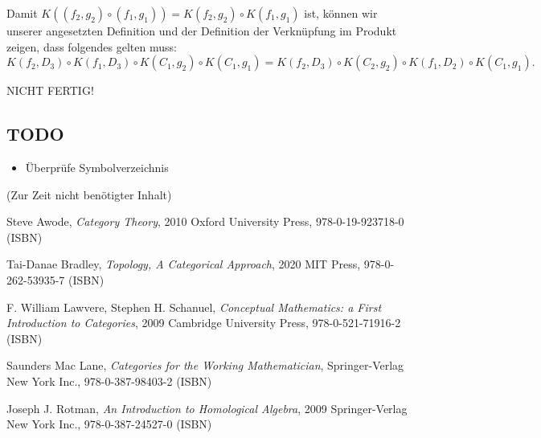 \documentclass[a4paper]{amsart}
\theoremstyle{definition}
\begin{document}
Damit $K((f_2,g_2) \circ (f_1,g_1)) = K(f_2,g_2) \circ K(f_1,g_1)$ ist, können wir unserer angesetzten Definition und der Definition der Verknüpfung im Produkt zeigen, dass folgendes gelten muss:
\begin{equation}
   K(f_2,D_3) \circ K(f_1, D_3)  \circ K(C_1, g_2)  \circ K(C_1,g_1) = K(f_2,D_3) \circ K(C_2,g_2)  \circ K(f_1,D_2)  \circ K(C_1,g_1).
\end{equation}


NICHT FERTIG!


\begin{backup}
\section{TODO}
\begin{itemize}
     \item Überprüfe Symbolverzeichnis
\end{itemize}

\end{backup}

\begin{backup}
    (Zur Zeit nicht benötigter Inhalt)
\end{backup}

\begin{thebibliography}{9}
      Steve Awode, \emph{Category Theory},
      2010 Oxford University Press, 978-0-19-923718-0 (ISBN)

      Tai-Danae Bradley, \emph{Topology, A Categorical Approach},
      2020 MIT Press, 978-0-262-53935-7 (ISBN)

      F. William Lawvere, Stephen H. Schanuel, \emph{Conceptual Mathematics: a First Introduction to Categories},
      2009 Cambridge University Press, 978-0-521-71916-2 (ISBN)

      Saunders Mac Lane, \emph{Categories for the Working Mathematician},
      Springer-Verlag New York Inc., 978-0-387-98403-2 (ISBN)

   	Joseph J. Rotman, \emph{An Introduction to Homological Algebra},
   	2009 Springer-Verlag New York Inc., 978-0-387-24527-0 (ISBN)

\end{thebibliography}
\end{document}
